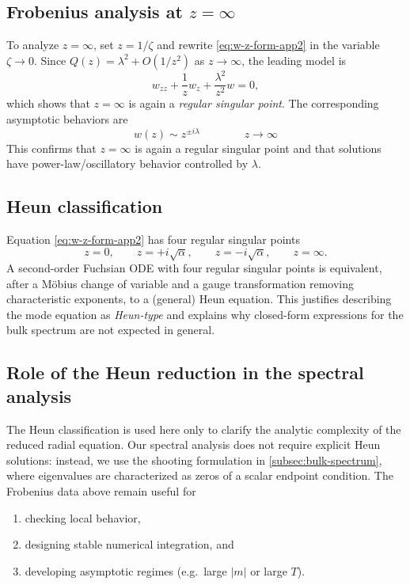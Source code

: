 \documentclass[11pt]{article}
\theoremstyle{definition}
\numberwithin{equation}{section}
\begin{document}
\subsection{Frobenius analysis at \(z=\infty\)}\label{app:heun-frob-inf}
To analyze \(z=\infty\), set \(z=1/\zeta\) and rewrite \eqref{eq:w-z-form-app2} in the variable \(\zeta\to 0\).
Since \(Q(z)=\lambda^{2}+O(1/z^2)\) as \(z\to\infty\), the leading model is
\begin{equation}
w_{zz}+\frac{1}{z}w_{z}+\frac{\lambda^{2}}{z^{2}}w=0,
\end{equation}
which shows that \(z=\infty\) is again a \emph{regular singular point}. The corresponding asymptotic behaviors are
\begin{equation}
w(z)\sim z^{\pm i\lambda}
\qquad
\qquad z\to\infty
\end{equation}
This confirms that $z=\infty$ is again a regular singular point and that solutions have
power-law/oscillatory behavior controlled by $\lambda$.


\subsection{Heun classification}\label{app:heun-classification2}
Equation \eqref{eq:w-z-form-app2} has four regular singular points
\begin{equation}
z=0,\qquad z=+i\sqrt{\alpha},\qquad z=-i\sqrt{\alpha},\qquad z=\infty.
\end{equation}
A second-order Fuchsian ODE with four regular singular points is equivalent, after a M\"obius change of variable and a
gauge transformation removing characteristic exponents, to a (general) Heun equation. This justifies describing the
mode equation as \emph{Heun-type} and explains why closed-form expressions for the bulk spectrum are not expected in
general.

\subsection{Role of the Heun reduction in the spectral analysis}\label{app:heun-role2}
The Heun classification is used here only to clarify the analytic complexity of the reduced radial equation. Our
spectral analysis does not require explicit Heun solutions: instead, we use the shooting formulation in \autoref{subsec:bulk-spectrum}, where eigenvalues are characterized as zeros of a scalar endpoint condition. The
Frobenius data above remain useful for 
\begin{enumerate}[label=(\roman*)]
\item checking local behavior, 
\item designing stable numerical integration, and 
\item developing asymptotic regimes (e.g.\ large \(|m|\) or large \(T\)).    
\end{enumerate}
\end{document}
